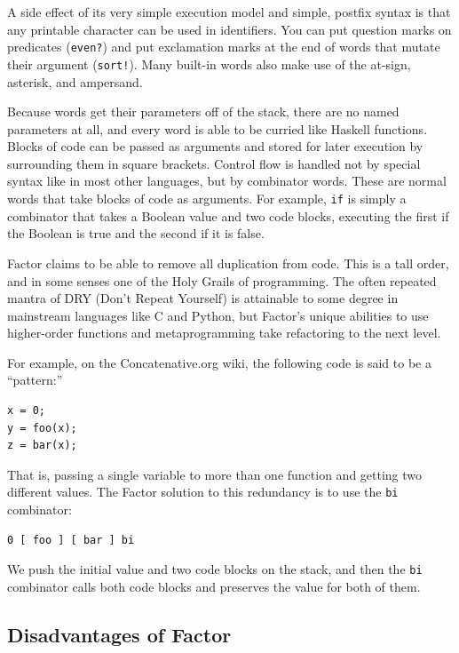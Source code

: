 \documentclass{article}
\begin{document}
A side effect of its very simple execution model and simple, postfix syntax is
that any printable character can be used in identifiers.  You can put question
marks on predicates (\texttt{even?}) and put exclamation marks at the end of
words that mutate their argument (\texttt{sort!}).  Many built-in words also
make use of the at-sign, asterisk, and ampersand.

Because words get their parameters off of the stack, there are no named
parameters at all, and every word is able to be curried like Haskell functions.
Blocks of code can be passed as arguments and stored for later execution
by surrounding them in square brackets.  Control flow is handled not by special
syntax like in most other languages, but by combinator words.  These are normal
words that take blocks of code as arguments.  For example, \texttt{if} is simply
a combinator that takes a Boolean value and two code blocks, executing the first
if the Boolean is true and the second if it is false.

Factor claims to be able to remove all duplication from code.  This is a tall
order, and in some senses one of the Holy Grails of programming.  The often
repeated mantra of DRY (Don't Repeat Yourself) is attainable to some degree in
mainstream languages like C and Python, but Factor's unique abilities to use
higher-order functions and metaprogramming take refactoring to the next level.

For example, on the Concatenative.org wiki, the following code
is said to be a ``pattern:''

\begin{verbatim}
x = 0;
y = foo(x);
z = bar(x);
\end{verbatim}

That is, passing a single variable to more than one function and getting two
different values.  The Factor solution to this redundancy is to use the
\texttt{bi} combinator:

\begin{verbatim}
0 [ foo ] [ bar ] bi
\end{verbatim}

We push the initial value and two code blocks on the stack, and then the
\texttt{bi} combinator calls both code blocks and preserves the value for both
of them.

\subsection{Disadvantages of Factor}
\end{document}
